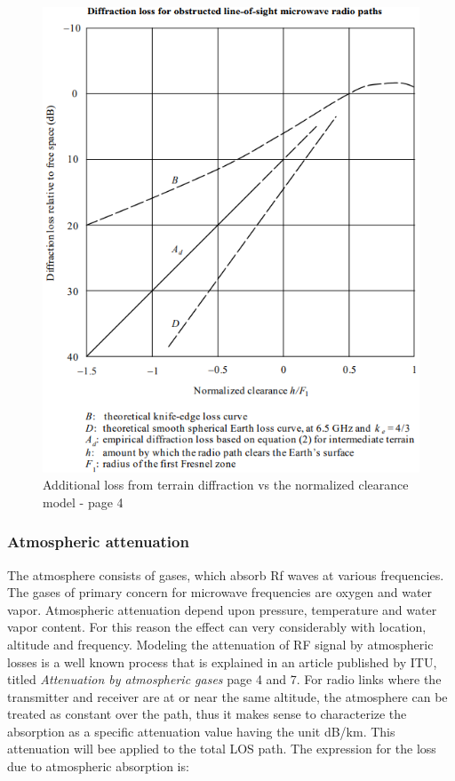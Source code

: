 \begin{figure}[h]
\centering
\includegraphics[scale=0.85]{figures/ITUTerrain.PNG}
\caption{Additional loss from terrain diffraction vs the normalized clearance model\cite{ITUTerrain} - page 4}
\end{figure}

\subsubsection{Atmospheric attenuation}
The atmosphere consists of gases, which absorb Rf waves at various frequencies. The gases of primary concern for microwave frequencies are oxygen and water vapor. Atmospheric attenuation depend upon pressure, temperature and water vapor content. For this reason the effect can very considerably with location, altitude and frequency. Modeling the attenuation of RF signal by atmospheric losses is a well known process that is explained in an article published by ITU, titled \textit{Attenuation by atmospheric gases}\cite{ITUAtmosphere} page 4 and 7. For radio links where the transmitter and receiver are at or near the same altitude, the atmosphere can be treated as constant over the path, thus it makes sense to characterize the absorption as a specific attenuation value having the unit dB/km. This attenuation will bee applied to the total LOS path. The expression for the loss due to atmospheric absorption is: 

